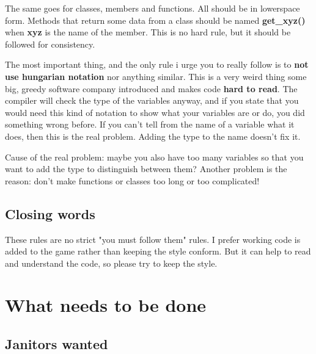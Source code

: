 \documentclass[english,a4paper,12pt]{report}
\begin{document}
    The same goes for classes, members and functions. All should be in
    lowerspace form. Methods that return some data from a class should
    be named \textbf{get\_xyz()} when \textbf{xyz} is the name of the
    member. This is no hard rule, but it should be followed for
    consistency.
    
    The most important thing, and the only rule i urge you to really
    follow is to \textbf{not use hungarian notation} nor anything
    similar. This is a very weird thing some big, greedy software
    company introduced and makes code \textbf{hard to read}. The
    compiler will check the type of the variables anyway, and if you
    state that you would need this kind of notation to show what your
    variables are or do, you did something wrong before. If you can't
    tell from the name of a variable what it does, then this is the real
    problem. Adding the type to the name doesn't fix it.

    Cause of the real problem: maybe you also have too many variables so
    that you want to add the type to distinguish between them? Another
    problem is the reason: don't make functions or classes too long or
    too complicated!
    

    \section{Closing words}

      These rules are no strict "you must follow them" rules. I prefer
      working code is added to the game rather than keeping the style
      conform. But it can help to read and understand the code, so
      please try to keep the style.
    
    \chapter{What needs to be done}

    \section{Janitors wanted}


 
\end{document}
